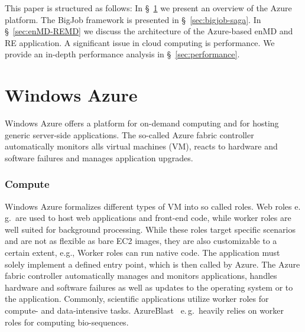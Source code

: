 \documentclass[conference,final]{IEEEtran}
\newcommand{\up}{\vspace*{-1em}}
\newcommand{\alnote}[1]{ {\textcolor{blue} { ***AL: #1 }}}
\newcommand{\jhanote}[1]{ {\textcolor{red} { ***SJ: #1 }}}
\newcommand{\alnote}[1]{}
\newcommand{\jhanote}[1]{}
\begin{document}
This paper is structured as follows: In \S~\ref{sec:azure} we present
an overview of the Azure platform. The BigJob framework is presented
in \S~\ref{sec:bigjob-saga}. In \S~\ref{sec:enMD-REMD} we discuss the
architecture of the Azure-based enMD and RE application.  A
significant issue in cloud computing is performance. We provide an
in-depth performance analysis in \S~\ref{sec:performance}.



\up
\section{Windows Azure}
\label{sec:azure}
\up
Windows Azure offers a platform for on-demand computing and for
hosting generic server-side applications. The so-called Azure fabric
controller automatically monitors alls virtual machines (VM), reacts
to hardware and software failures and manages application upgrades.

\subsubsection{Compute}

Windows Azure formalizes different types of VM into so called
roles. Web roles e.\,g.\ are used to host web applications and
front-end code, while worker roles are well suited for background
processing. While these roles target specific scenarios and are not as
flexible as bare EC2 images, they are also customizable to a certain
extent, e.g., Worker roles can run native code. The application must
solely implement a defined entry point, which is then called by
Azure. The Azure fabric controller automatically manages and monitors
applications, handles hardware and software failures as well as
updates to the operating system or to the application.  Commonly,
scientific applications utilize worker roles for compute- and
data-intensive tasks. AzureBlast~\cite{azure_blast} e.\,g.\ heavily
relies on worker roles for computing bio-sequences.
\end{document}

